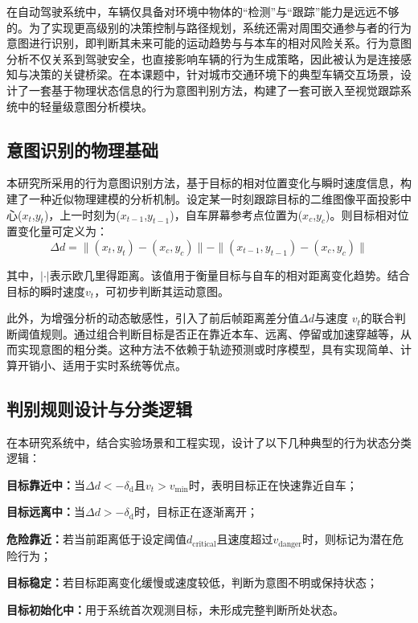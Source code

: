 在自动驾驶系统中，车辆仅具备对环境中物体的“检测”与“跟踪”能力是远远不够的。为了实现更高级别的决策控制与路径规划，系统还需对周围交通参与者的行为意图进行识别，即判断其未来可能的运动趋势与与本车的相对风险关系。行为意图分析不仅关系到驾驶安全，也直接影响车辆的行为生成策略，因此被认为是连接感知与决策的关键桥梁。在本课题中，针对城市交通环境下的典型车辆交互场景，设计了一套基于物理状态信息的行为意图判别方法，构建了一套可嵌入至视觉跟踪系统中的轻量级意图分析模块。

\subsection{意图识别的物理基础}

本研究所采用的行为意图识别方法，基于目标的相对位置变化与瞬时速度信息，构建了一种近似物理建模的分析机制。设定某一时刻跟踪目标的二维图像平面投影中心($x_t$,$y_t$)，上一时刻为($x_{t-1}$,$y_{t-1}$)，自车屏幕参考点位置为($x_c$,$y_c$)。则目标相对位置变化量可定义为：
\[\Delta d = \|(x_t, y_t) - (x_c, y_c)\| - \|(x_{t - 1}, y_{t - 1}) - (x_c, y_c)\|\]

其中，$\left| \cdot \right|$表示欧几里得距离。该值用于衡量目标与自车的相对距离变化趋势。结合目标的瞬时速度$v_t$，可初步判断其运动意图。

此外，为增强分析的动态敏感性，引入了前后帧距离差分值$\Delta d$与速度 $v_t$的联合判断阈值规则。通过组合判断目标是否正在靠近本车、远离、停留或加速穿越等，从而实现意图的粗分类。这种方法不依赖于轨迹预测或时序模型，具有实现简单、计算开销小、适用于实时系统等优点。

\subsection{判别规则设计与分类逻辑}

在本研究系统中，结合实验场景和工程实现，设计了以下几种典型的行为状态分类逻辑：

\textbf{目标靠近中：}当$\Delta d < -\delta_{\mathrm{d}}$且$v_t>v_{\text{min}}$时，表明目标正在快速靠近自车；

\textbf{目标远离中：}当$\Delta d > -\delta_{\mathrm{d}}$时，目标正在逐渐离开；

\textbf{危险靠近：}若当前距离低于设定阈值$d_{\text{critical}}$且速度超过$v_{\text{danger}}$时，则标记为潜在危险行为；

\textbf{目标稳定：}若目标距离变化缓慢或速度较低，判断为意图不明或保持状态；

\textbf{目标初始化中：}用于系统首次观测目标，未形成完整判断所处状态。

